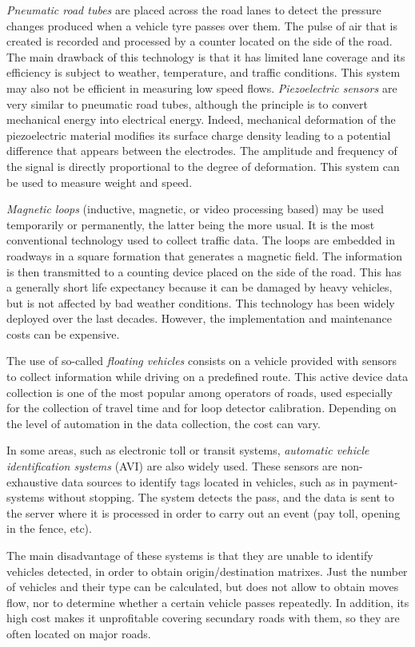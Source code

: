\documentclass[preprint,authoryear,12pt]{elsarticle}
\begin{document}
\emph{Pneumatic road tubes} are placed across the road lanes to detect the pressure changes produced when a vehicle tyre passes over them. The pulse of air that is created is recorded and processed by a counter located on the side of the road. The main drawback of this technology is that it has limited lane coverage and its efficiency is subject to weather, temperature, and traffic conditions. This system may also not be efficient in measuring low speed flows.
\emph{Piezoelectric sensors} are very similar to pneumatic road tubes, although the principle is to convert mechanical energy into electrical energy. Indeed, mechanical deformation of the piezoelectric material modifies its surface charge density leading to a potential difference that appears between the electrodes. The amplitude and frequency of the signal is directly proportional to the degree of deformation. This system can be used to measure weight and speed.

\emph{Magnetic loops} (inductive, magnetic, or video processing based) may be used temporarily or permanently, the latter being the more usual. 
It is the most conventional technology used to collect traffic data. The loops are embedded in roadways in a square formation that generates a magnetic field. The information is then transmitted to a counting device placed on the side of the road. This has a generally short life expectancy because it can be damaged by heavy vehicles, but is not affected by bad weather conditions. This technology has been widely deployed over the last decades. However, the implementation and maintenance costs can be expensive.

The use of so-called \emph{floating vehicles} consists on a vehicle provided with sensors to collect information while driving on a predefined route.
This active device data collection is one of the most popular among operators of roads, used especially for the collection of travel time and for loop detector calibration.
Depending on the level of automation in the data collection, the cost can vary.

In some areas, such as electronic toll or transit systems, \emph{automatic vehicle identification systems} (AVI) are also widely used. 
These sensors are non-exhaustive data sources to identify tags located in vehicles, such as in payment-systems without stopping. 
The system detects the pass, and the data is sent to the server where it is processed in order to carry out an event (pay toll, opening in the fence, etc).

The main disadvantage of these systems is that they are unable to identify vehicles detected, in order to obtain origin/destination matrixes.
Just the number of vehicles and their type can be calculated, but does not allow to obtain moves flow, nor to determine whether a certain vehicle passes repeatedly.
In addition, its high cost makes it unprofitable covering secundary roads with them, so they are often located on major roads.
\end{document}
